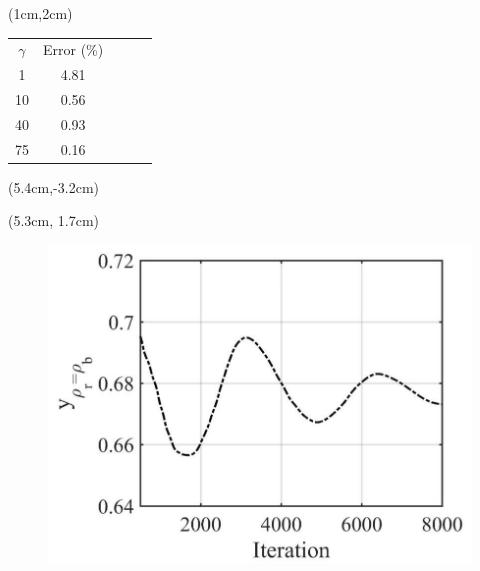 \documentclass[xcolor=table]{beamer}
\begin{document}
\begin{frame}
\begin{textblock*}{5cm}
			\end{textblock*}
			\begin{textblock*}{5cm}(1cm,2cm)
			\begin{table}[]
				\centering
				\begin{tabular}{c|clll}
					$\gamma$ & Error (\%) &  &  &  \\ \cline{1-2}
					1      & 4.81       &  &  &  \\
					10     & 0.56       &  &  &  \\
					40     & 0.93       &  &  &  \\
					75     & 0.16       &  &  & 
				\end{tabular}
			\end{table}
			\end{textblock*}
			\begin{textblock*}{5cm}(5.4cm,-3.2cm)
			\end{textblock*}
				\begin{textblock*}{5cm}(5.3cm, 1.7cm)
					\begin{figure}
						\centering
						\includegraphics[scale=0.13]{Resources/oscilValid.png}

\end{figure}
\end{textblock*}
\end{frame}
\end{document}
